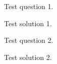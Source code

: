\documentclass[online]{uob-cs-exam} %
\begin{document}
\maketitle

  \begin{questions}

    \question[10] Test question 1.
    \droppoints


    \begin{solution}
      Test solution 1.
    \end{solution}

    \question[10] Test question 2.
    \droppoints

    \begin{solution}
      Test solution 2.
    \end{solution}

  \end{questions}
\end{document}
